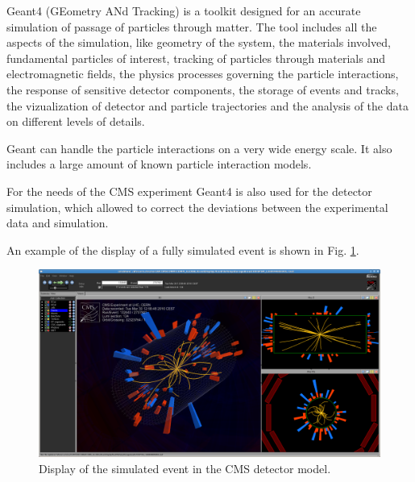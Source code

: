 Geant4 (GEometry ANd Tracking) \cite{Agostinelli:2002hh} is a toolkit designed for an accurate simulation of passage of particles through matter.
The tool includes all the aspects of the simulation, like geometry of the system, the materials involved, fundamental particles of interest,
tracking of particles through materials and electromagnetic fields, the physics processes governing the particle interactions, the response of
sensitive detector components, the storage of events and tracks, the vizualization of detector and particle trajectories and the analysis of
the data on different levels of details.

Geant can handle the particle interactions on a very wide energy scale. It also includes a large amount of known particle interaction models.

For the needs of the CMS experiment Geant4 is also used for the detector simulation, which allowed to correct the deviations between the experimental 
data and simulation.

An example of the display of a fully simulated event is shown in Fig. \ref{fig:Evt_display}.

 \begin{figure}[h]
  \centering
  \includegraphics[width=1.0\textwidth]{03_simulation/plots/CMS1stEvent.png}
  \caption{Display of the simulated event in the CMS detector model.}
  \label{fig:Evt_display}
 \end{figure}